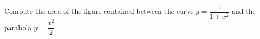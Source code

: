 
%
%
%
%
% 
% 

\question Compute the area of the figure contained between the curve 
$y = \dfrac{1}{1+x^2}$ and the parabola $y=\dfrac{x^2}{2}$

\insertQR{}

